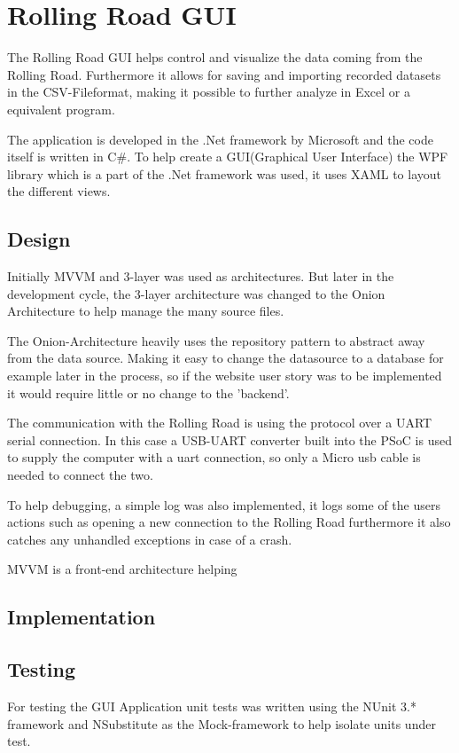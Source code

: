 \section{Rolling Road GUI}

The Rolling Road GUI helps control and visualize the data coming from the Rolling Road. Furthermore it allows for saving and importing recorded datasets in the CSV-Fileformat, making it possible to further analyze in Excel or a equivalent program.

The application is developed in the .Net framework by Microsoft and the code itself is written in C\#.
To help create a GUI(Graphical User Interface) the WPF library which is a part of the .Net framework was used, it uses XAML to layout the different views.

\subsection{Design}

Initially MVVM and 3-layer was used as architectures. But later in the development cycle, the 3-layer architecture was changed to the Onion Architecture to help manage the many source files.

The Onion-Architecture heavily uses the repository pattern to abstract away from the data source. Making it easy to change the datasource to a database for example later in the process, so if the website user story was to be implemented it would require little or no change to the 'backend'.

The communication with the Rolling Road is using the  protocol over a UART serial connection. In this case a USB-UART converter built into the PSoC is used to supply the computer with a uart connection, so only a Micro usb cable is needed to connect the two.

To help debugging, a simple log was also implemented, it logs some of the users actions such as opening a new connection to the Rolling Road furthermore it also catches any unhandled exceptions in case of a crash.

MVVM is a front-end architecture helping 

\subsection{Implementation}

\subsection{Testing}

For testing the GUI Application unit tests was written using the NUnit 3.* framework and NSubstitute as the Mock-framework to help isolate units under test. 